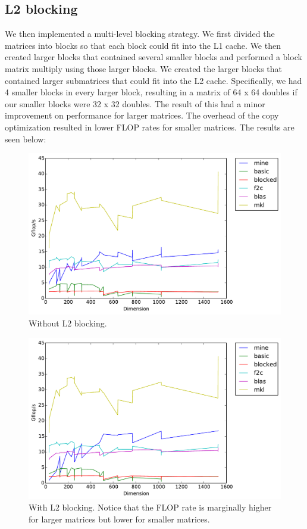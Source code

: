 \documentclass[11pt]{article}
\begin{document}
        \clearpage  
        

        \subsection{L2 blocking}

        We then implemented a multi-level blocking strategy. We first divided the matrices into blocks so that each block could fit into the L1 cache. We then created larger blocks that contained several smaller blocks and performed a block matrix multiply using those larger blocks. We created the larger blocks that contained larger submatrices that could fit into the L2 cache.  Specifically, we had 4 smaller blocks in every larger block, resulting in a matrix of 64 x 64 doubles if our smaller blocks were 32 x 32 doubles. The result of this had a minor improvement on performance for larger matrices. The overhead of the copy optimization resulted in lower FLOP rates for smaller matrices. The results are seen below:
        \begin{figure}[H]
            \centering
            \includegraphics[width=4.5in]{timing_noL2.pdf}
            \caption{Without L2 blocking.}
        \end{figure}

        \begin{figure}[H]
            \centering
            \includegraphics[width=4.5in]{timing_L2.pdf}
            \caption{With L2 blocking. Notice that the FLOP rate is marginally higher for larger matrices but lower for smaller matrices.}
        \end{figure}
\end{document}
